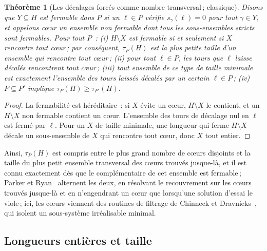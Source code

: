 \documentclass[11pt,a4paper]{article}
\newtheorem{theorem}{Théorème}
\newcommand{\shift}{s}
\newcommand{\lean}[1]{\texttt{\detokenize{#1}}}
\newenvironment{evidence}[3][]{}{}
\begin{document}
\begin{evidence}{cited}{\cite{amaldi2003maxfs,parker1996iis}\,; (ii) aussi en Lean~: \lean{meets_infeasible}}
\begin{theorem}[Les décalages forcés comme nombre transversal\,; classique]\label{thm:transversal}
Disons que $Y \subseteq H$ est \emph{fermable} dans $P$ si un $\ell \in P$
vérifie $\shift_\gamma(\ell) = 0$ pour tout $\gamma \in Y$, et appelons
\emph{cœur} un ensemble non fermable dont tous les sous-ensembles stricts sont
fermables. Pour tout $P$~: (i) $H \setminus X$ est fermable si et seulement si
$X$ rencontre tout cœur\,; par conséquent, $\tau_P(H)$ est la plus petite
taille d'un ensemble qui rencontre tout cœur\,; (ii) pour tout $\ell \in P$,
les tours que $\ell$ laisse décalés rencontrent tout cœur\,; (iii) tout
ensemble de ce type de taille minimale est exactement l'ensemble des tours
laissés décalés par un certain $\ell \in P$\,; (iv) $P \subseteq P'$ implique
$\tau_P(H) \ge \tau_{P'}(H)$.
\end{theorem}
\end{evidence}

\begin{proof}
La fermabilité est héréditaire~: si $X$ évite un cœur, $H \setminus X$ le
contient, et un $H \setminus X$ non fermable contient un cœur. L'ensemble des
tours de décalage nul en $\ell$ est fermé par $\ell$. Pour un $X$ de taille
minimale, une longueur qui ferme $H \setminus X$ décale un sous-ensemble de
$X$ qui rencontre tout cœur, donc $X$ tout entier.
\end{proof}

Ainsi, $\tau_P(H)$ est compris entre le plus grand nombre de cœurs disjoints
et la taille du plus petit ensemble transversal des cœurs trouvés jusque-là,
et il est connu exactement dès que le complémentaire de cet ensemble est
fermable\,; Parker et Ryan~\cite{parker1996iis} alternent les deux, en
résolvant le recouvrement sur les cœurs trouvés jusque-là et en n'engendrant
un cœur que lorsqu'une solution d'essai le viole\,; ici, les cœurs viennent des routines de filtrage de Chinneck et
Dravnieks~\cite{chinneck1991locating}, qui isolent un sous-système
irréalisable minimal.

\subsection{Longueurs entières et taille}\label{sec:whole}
\end{document}
